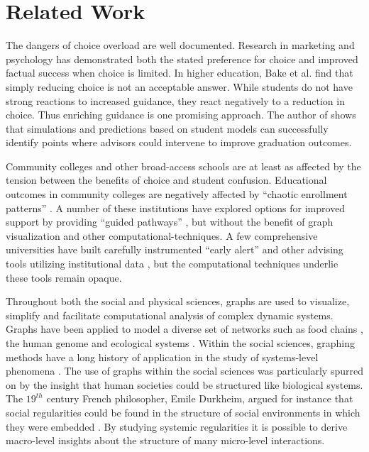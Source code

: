 \documentclass{sigchi}
\begin{document}


\section{Related Work}


The dangers of choice overload are well documented. Research in marketing \cite{botti2006} and psychology \cite{schwartz2004paradox,iyengar2000} has demonstrated both the stated preference for
choice and improved factual success when choice is limited. In higher education, Bake et al. \cite{bake2018} find that simply reducing choice is not an acceptable answer. While students do not have strong reactions to increased guidance, they react negatively to a reduction in choice. Thus enriching guidance is one promising
approach. The author of \cite{slim2016} shows that simulations and
predictions based on student models can successfully identify points
where advisors could intervene to improve graduation outcomes.

Community colleges and other broad-access schools are at least as affected by the tension between the benefits of choice and student confusion. Educational
outcomes in community colleges are negatively affected by ``chaotic
enrollment patterns'' \cite{crosta2014, bail2015, scot2015}. A number of these institutions have explored options for improved support by providing ``guided pathways'' \cite{jenkins2013}, but without the benefit of graph visualization and other computational-techniques. A few comprehensive universities have built carefully instrumented ``early alert'' and other advising tools utilizing institutional data \cite{fletcher2016integrated}, but the computational techniques underlie these tools remain opaque. 

Throughout both the social and physical sciences, graphs are used to visualize, simplify and facilitate computational analysis of complex dynamic systems. Graphs have been applied to model a diverse set of networks such as food chains \cite{Hall1993}, the human genome \cite{Pevzner1989} and ecological systems \cite{Fortin2012}. Within the social sciences, graphing methods have a long history of application in the study of systems-level phenomena \cite{Borgatti2009}. The use of graphs within the social sciences was particularly spurred on by the insight that human societies could be structured like biological systems. The $19^{th}$ century French philosopher, Emile Durkheim, argued for instance that social regularities could be found in the structure of social environments in which they were embedded \cite{Durkheim1951}. By studying systemic regularities it is possible to derive macro-level insights about the structure of many micro-level interactions. 
\end{document}

